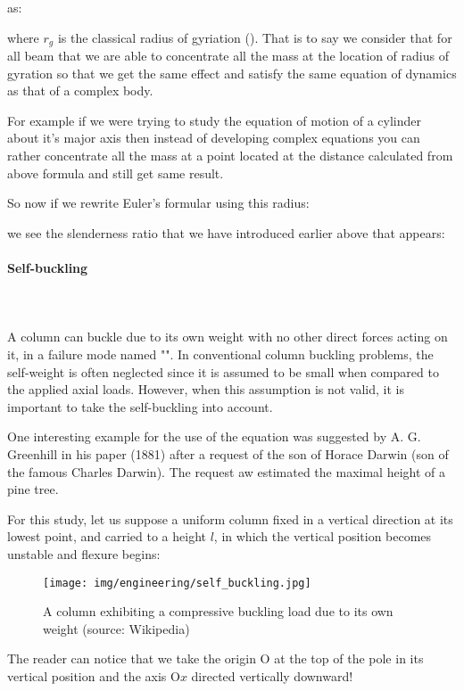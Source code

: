 	as:
	
	where $r_g$ is the classical radius of gyriation (). That is to say we consider that for all beam that we are able to concentrate all the mass at the location of radius of gyration so that we get the same effect and satisfy the same equation of dynamics as that of a complex body.

	For example if we were trying to study the equation of motion of a cylinder about it's major axis then instead of developing complex equations you can rather concentrate all the mass at a point located at the distance calculated from above formula and still get same result.

	So now if we rewrite Euler's formular using this radius:
	
	we see the slenderness ratio that we have introduced earlier above that appears:
	
	
	\pagebreak
	\paragraph{Self-buckling}\mbox{}\\\\
	A column can buckle due to its own weight with no other direct forces acting on it, in a failure mode named "". In conventional column buckling problems, the self-weight is often neglected since it is assumed to be small when compared to the applied axial loads. However, when this assumption is not valid, it is important to take the self-buckling into account.
	
	One interesting example for the use of the equation was suggested by A. G. Greenhill in his paper (1881) after a request of the son of Horace Darwin (son of the famous Charles Darwin). The request aw estimated the maximal height of a pine tree.
	
	For this study, let us suppose a uniform column fixed in a vertical direction at its lowest point, and carried to a height $l$, in which the vertical position becomes unstable and flexure begins:
	\begin{figure}[H]
		\centering
		\texttt{[image: img/engineering/self\_buckling.jpg]}
		\caption{A column exhibiting a compressive buckling load due to its own weight (source: Wikipedia)}
	\end{figure}
	The reader can notice that we take the origin O at the top of the pole in its vertical position and the axis $\text{O}x$ directed vertically downward!
	
